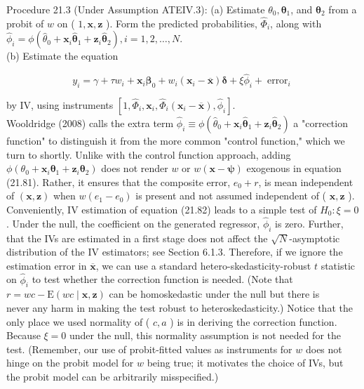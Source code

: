 \documentclass[10pt]{article}
\begin{document}
Procedure 21.3 (Under Assumption ATEIV.3): (a) Estimate $\theta_{0}, \boldsymbol{\theta}_{1}$, and $\boldsymbol{\theta}_{2}$ from a probit of $w$ on ( $1, \mathbf{x}, \mathbf{z}$ ). Form the predicted probabilities, $\hat{\Phi}_{i}$, along with $\hat{\phi}_{i}= \phi\left(\hat{\theta}_{0}+\mathbf{x}_{i} \hat{\boldsymbol{\theta}}_{1}+\mathbf{z}_{i} \hat{\boldsymbol{\theta}}_{2}\right), i=1,2, \ldots, N$.\\
(b) Estimate the equation


\begin{equation*}
y_{i}=\gamma+\tau w_{i}+\mathbf{x}_{i} \boldsymbol{\beta}_{0}+w_{i}\left(\mathbf{x}_{i}-\overline{\mathbf{x}}\right) \boldsymbol{\delta}+\xi \hat{\phi}_{i}+\operatorname{error}_{i} \tag{21.82}
\end{equation*}


by IV, using instruments $\left[1, \hat{\Phi}_{i}, \mathbf{x}_{i}, \hat{\Phi}_{i}\left(\mathbf{x}_{i}-\overline{\mathbf{x}}\right), \hat{\phi}_{i}\right]$.\\
Wooldridge (2008) calls the extra term $\hat{\phi}_{i} \equiv \phi\left(\hat{\theta}_{0}+\mathbf{x}_{i} \hat{\boldsymbol{\theta}}_{1}+\mathbf{z}_{i} \hat{\boldsymbol{\theta}}_{2}\right)$ a "correction function" to distinguish it from the more common "control function," which we turn to shortly. Unlike with the control function approach, adding $\phi\left(\theta_{0}+\mathbf{x}_{i} \boldsymbol{\theta}_{1}+\mathbf{z}_{i} \boldsymbol{\theta}_{2}\right)$ does not render $w$ or $w(\mathbf{x}-\boldsymbol{\psi})$ exogenous in equation (21.81). Rather, it ensures that the composite error, $e_{0}+r$, is mean independent of $(\mathbf{x}, \mathbf{z})$ when $w\left(e_{1}-e_{0}\right)$ is present and not assumed independent of ( $\mathbf{x}, \mathbf{z}$ ). Conveniently, IV estimation of equation (21.82) leads to a simple test of $H_{0}: \xi=0$. Under the null, the coefficient on the generated regressor, $\hat{\phi}_{i}$ is zero. Further, that the IVs are estimated in a first stage does not affect the $\sqrt{N}$-asymptotic distribution of the IV estimators; see Section 6.1.3. Therefore, if we ignore the estimation error in $\overline{\mathbf{x}}$, we can use a standard hetero-skedasticity-robust $t$ statistic on $\hat{\phi}_{i}$ to test whether the correction function is needed. (Note that $r=w c-\mathrm{E}(w c \mid \mathbf{x}, \mathbf{z})$ can be homoskedastic under the null but there is\\
never any harm in making the test robust to heteroskedasticity.) Notice that the only place we used normality of ( $c, a$ ) is in deriving the correction function. Because $\xi=0$ under the null, this normality assumption is not needed for the test. (Remember, our use of probit-fitted values as instruments for $w$ does not hinge on the probit model for $w$ being true; it motivates the choice of IVs, but the probit model can be arbitrarily misspecified.)
\end{document}
